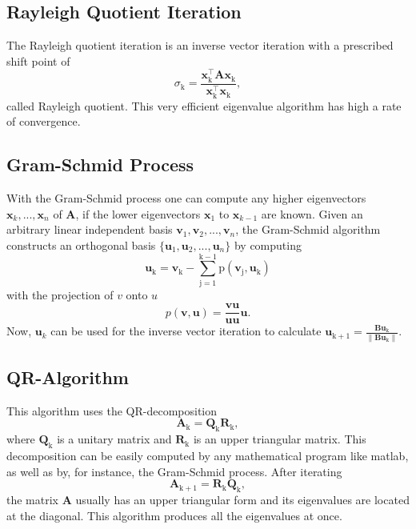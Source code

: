 \documentclass[conference]{journal}
\begin{document}
	\subsection*{Rayleigh Quotient Iteration}
	The Rayleigh quotient iteration is an inverse vector iteration with a prescribed shift point of
	\begin{equation}
	\sigma_{\mathrm{k}}=\frac{\textbf{\^x}_{\mathrm{k}}^\intercal\textbf{A\^x}_{\mathrm{k}}}{\textbf{\^x}_{\mathrm{k}}^\intercal\textbf{\^x}_{\mathrm{k}}},
	\end{equation}
	called Rayleigh quotient. This very efficient eigenvalue algorithm has high a rate of convergence.
	
	\subsection*{Gram-Schmid Process}
	With the Gram-Schmid process one can compute any higher eigenvectors $\textbf{\^x}_k,...,\textbf{\^x}_n$ of 
	$\textbf{A}$, if the lower eigenvectors $\textbf{\^x}_1$ to $\textbf{\^x}_{k-1}$ are known. Given an arbitrary linear independent basis $\textbf{v} _1, \textbf{v}_2, ..., \textbf{v}_n$, the Gram-Schmid algorithm constructs an orthogonal basis $\{\textbf{u}_1, \textbf{u}_2,..., \textbf{u}_n\}$ by computing 
	\begin{equation}
	\textbf{u}_{\mathrm{k}} = \textbf{v}_{\mathrm{k}} -\sum_{\mathrm{j=1}}^{\mathrm{k-1}}\mathrm{p}(\textbf{v}_{\mathrm{j}},\textbf{u}_{\mathrm{k}})
	\end{equation}
	with the projection of $v$ onto $u$
	\begin{equation}
	p(\textbf{v},\textbf{u})=\frac{\textbf{v}\textbf{u}}{\textbf{u}\textbf{u}}\textbf{u}.
	\end{equation}
	Now, $\textbf{u}_k$ can be used for the inverse vector iteration to calculate
	$\textbf{u}_\mathrm{k+1}=\frac{\textbf{Bu}_\mathrm{k}}{\lVert \textbf{Bu}_\mathrm{k} \rVert}$.
	
	\subsection*{QR-Algorithm}
	This algorithm uses the QR-decomposition
	\begin{equation}
	\textbf{A}_\mathrm{k}={\textbf{Q}_\mathrm{k}}{\textbf{R}_\mathrm{k}},
	\end{equation}
	where $\textbf{Q}_\mathrm{k}$ is a unitary matrix and $\textbf{R}_\mathrm{k}$ is an upper triangular matrix.
	This decomposition can be easily computed by any mathematical program like matlab, as well as by, for instance, the Gram-Schmid process. After iterating
	\begin{equation}
	\textbf{A}_\mathrm{k+1}={\textbf{R}_\mathrm{k}}{\textbf{Q}_\mathrm{k}},
	\end{equation}
	the matrix $\textbf{A}$ usually has an upper triangular form and its eigenvalues are located at the diagonal. This algorithm produces all the eigenvalues at once.
	 
\end{document}
